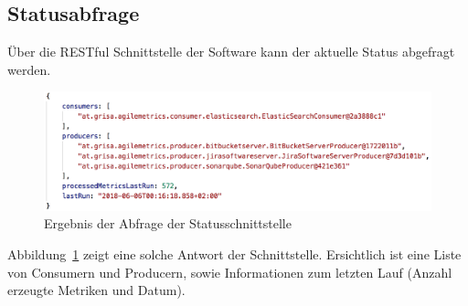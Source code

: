 \newpage
\subsection{Statusabfrage}

Über die RESTful Schnittstelle der Software kann der aktuelle Status abgefragt werden.

\begin{savenotes}
    \begin{figure}[H] 
        \centering
            \includegraphics[width=1.0\textwidth]{img/status-api.png}
        \caption{Ergebnis der Abfrage der Statusschnittstelle}\label{fig:status-api}
    \end{figure}
\end{savenotes}

Abbildung~\ref{fig:status-api} zeigt eine solche Antwort der Schnittstelle. Ersichtlich ist eine Liste von Consumern und Producern, sowie Informationen zum letzten Lauf (Anzahl erzeugte Metriken und Datum).
